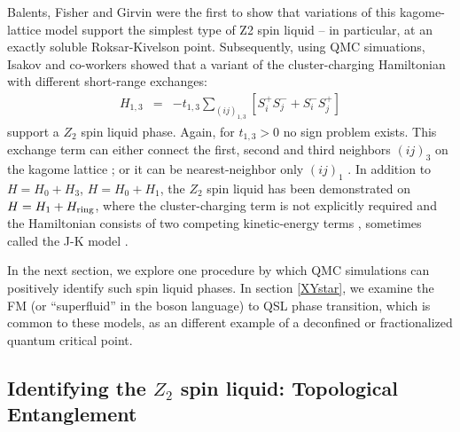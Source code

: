 \documentclass[range]{ar2e}
\begin{document}
Balents, Fisher and Girvin \cite{BFG} were the first to show that variations of this kagome-lattice model support the simplest type of Z2 spin liquid -- in particular, at an exactly soluble Roksar-Kivelson point.  Subsequently, using QMC simuations, Isakov and co-workers showed that a variant of the cluster-charging Hamiltonian with different short-range exchanges: 
\begin{eqnarray}
H_{1,3} &=& -t_{1,3} \sum_{( ij )_{1,3}} [S^{+}_i S^-_j + S^-_i S^{+}_j]  
\end{eqnarray}
support a $Z_2$ spin liquid phase.  Again, for $t_{1,3}>0$ no sign problem exists.  This exchange term can either connect the first, second and third neighbors $( ij )_3$ on the kagome lattice \cite{Isakov1,Isakov2}; or it can be nearest-neighbor only $( ij )_1$ \cite{TopoEE}.  
In addition to  $H = H_0 + H_3$, $H = H_0 + H_1$, the $Z_2$ spin liquid has been demonstrated on $H = H_1 + H_{\rm ring}$, where the cluster-charging term is not explicitly required and the Hamiltonian consists of two competing kinetic-energy terms \cite{Long}, sometimes called the J-K model \cite{JKqmc}.



In the next section, we explore one procedure by which QMC simulations can positively identify such spin liquid phases.  In section \ref{XYstar}, we examine the FM (or ``superfluid'' in the boson language) to QSL phase transition, which is common to these models, as an different example of a deconfined or fractionalized quantum critical point.

\subsection{Identifying the $Z_2$ spin liquid: Topological Entanglement} \label{topoEEsec}
\end{document}
